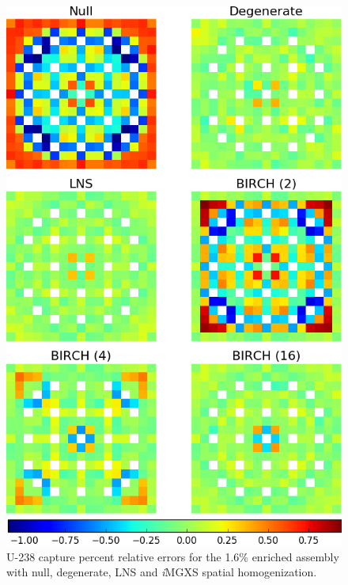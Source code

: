 \begin{figure}[h!]
\centering
\includegraphics[width=0.87\linewidth]{figures/results/spatial/assm-16/capt-err}
\vspace{2mm}
\caption[U-238 capture errors for the 1.6\% enriched assembly]{U-238 capture percent relative errors for the 1.6\% enriched assembly with null, degenerate, \ac{LNS} and \textit{i}\ac{MGXS} spatial homogenization.}
\label{fig:chap11-assm-1.6-capt-err}
\end{figure}

\clearpage

